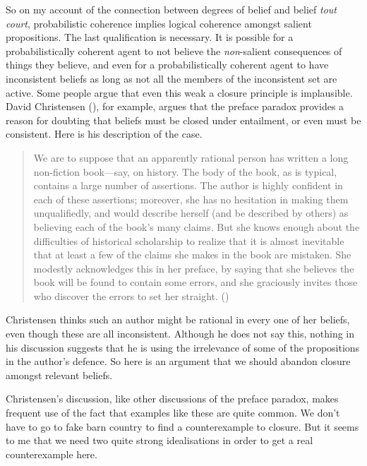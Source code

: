 \documentclass[
  11pt,
  letterpaper,
  DIV=11,
  numbers=noendperiod,
  twoside]{scrartcl}
\begin{document}
So on my account of the connection between degrees of belief and belief
\emph{tout court}, probabilistic coherence implies logical coherence
amongst salient propositions. The last qualification is necessary. It is
possible for a probabilistically coherent agent to not believe the
\emph{non}-salient consequences of things they believe, and even for a
probabilistically coherent agent to have inconsistent beliefs as long as
not all the members of the inconsistent set are active. Some people
argue that even this weak a closure principle is implausible. David
Christensen (), for example, argues
that the preface paradox provides a reason for doubting that beliefs
must be closed under entailment, or even must be consistent. Here is his
description of the case.

\begin{quote}
We are to suppose that an apparently rational person has written a long
non-fiction book---say, on history. The body of the book, as is typical,
contains a large number of assertions. The author is highly confident in
each of these assertions; moreover, she has no hesitation in making them
unqualifiedly, and would describe herself (and be described by others)
as believing each of the book's many claims. But she knows enough about
the difficulties of historical scholarship to realize that it is almost
inevitable that at least a few of the claims she makes in the book are
mistaken. She modestly acknowledges this in her preface, by saying that
she believes the book will be found to contain some errors, and she
graciously invites those who discover the errors to set her straight.
()
\end{quote}

Christensen thinks such an author might be rational in every one of her
beliefs, even though these are all inconsistent. Although he does not
say this, nothing in his discussion suggests that he is using the
irrelevance of some of the propositions in the author's defence. So here
is an argument that we should abandon closure amongst relevant beliefs.

Christensen's discussion, like other discussions of the preface paradox,
makes frequent use of the fact that examples like these are quite
common. We don't have to go to fake barn country to find a
counterexample to closure. But it seems to me that we need two quite
strong idealisations in order to get a real counterexample here.
\end{document}
